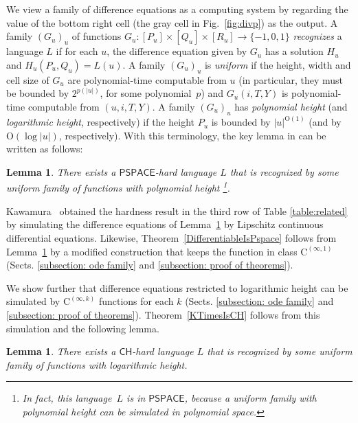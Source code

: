 \documentclass[12pt,a4paper]{article}
\newtheorem{lemma}[theorem]{Lemma}
\theoremstyle{definition}
\theoremstyle{remark}
\newcommand{\classPSPACE}{\mathsf{PSPACE}}
\newcommand{\classCH}{\mathsf{CH}}
\newcommand{\classC}{\mathrm C}
\begin{document}
We view a family of difference equations as a computing system by
regarding the value of the bottom right cell (the gray cell in Fig.~\ref{fig:divp}) as the output. 
A family $(G_u)_u$ of functions 
$G_u \colon [P_u] \times [Q_u] \times [R_u] \to \{-1, 0, 1\}$
\emph{recognizes} a language $L$ if for each $u$,
the difference equation given by $G_u$ has a solution $H_u$ 
and $H_u(P_u, Q_u) = L(u)$.
A family $(G_u)_u$ is \emph{uniform} 
if the height, width and cell size of $G_u$ are 
polynomial-time computable from $u$ (in particular, 
they must be bounded by $2^{p(|u|)}$, for some polynomial~$p$)
and $G_u(i, T, Y)$ is polynomial-time computable from $(u, i, T, Y)$.
A family $(G_u)_u$ has \emph{polynomial height} 
(and \emph{logarithmic height}, respectively)
if the height $P_u$ is bounded by $|u| ^{\mathrm O (1)}$
(and by $\mathrm O (\log |u|)$, respectively).
With this terminology,
the key lemma in 
\cite[Lemma 4.7]{kawamura2010lipschitz} 
can be written as follows:
\begin{lemma}
 \label{DIVPpolyIsPSPACEhard}
 There exists a $\classPSPACE$-hard language $L$ that is recognized by some uniform family of functions with polynomial height%
 \footnote{In fact, 
this language~$L$ is in $\classPSPACE$, 
because a uniform family with polynomial height 
can be simulated in polynomial space.
}.
\end{lemma}

Kawamura~\cite{kawamura2010lipschitz} obtained the hardness result in the third row of Table \ref{table:related} 
by simulating the difference equations of Lemma~\ref{DIVPpolyIsPSPACEhard}
by Lipschitz continuous differential equations. 
Likewise, 
Theorem~\ref{DifferentiableIsPspace} follows from Lemma~\ref{DIVPpolyIsPSPACEhard}
by a modified construction that keeps 
the function in class $\classC ^{(\infty, 1)}$ 
(Sects. \ref{subsection: ode family} and \ref{subsection: proof of theorems}).

We show further that 
difference equations restricted to logarithmic height can be simulated by
$\classC ^{(\infty, k)}$ functions for each $k$ 
(Sects. \ref{subsection: ode family} and \ref{subsection: proof of theorems}).
Theorem~\ref{KTimesIsCH} follows from this simulation and the following lemma.
\begin{lemma}
 \label{DIVPlogIsCHhard}
 There exists a $\classCH$-hard language $L$ that is recognized by some uniform family of functions with logarithmic height.
\end{lemma}
\end{document}
